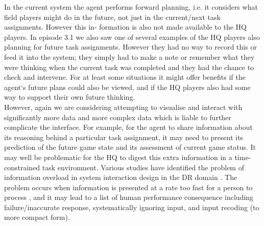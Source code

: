 In the current system the agent performs forward planning, i.e. it considers what field players might do in the future, not just in the current/next task assignments. However this in- formation is also not made available to the HQ players. In episode 3.1 we also saw one of several examples of the HQ players also planning for future task assignments. However they had no way to record this or feed it into the system; they simply had to make a note or remember what they were thinking when the current task was completed and they had the chance to check and intervene. For at least some situations it might offer benefits if the agent`s future plans could also be viewed, and if the HQ players also had some way to support their own future thinking.\\

However, again we are considering attempting to visualise and interact with significantly more data and more complex data which is liable to further complicate the interface. For example, for the agent to share information about its reasoning behind a particular task assignment, it may need to present its prediction of the future game state and its assessment of current game status. It may well be problematic for the HQ to digest this extra information in a time-constrained task environment. Various studies have identified the problem of information overload in system interaction design in the \ac{DR} domain \citep{Carver2007,Turoff2004a}. The problem occurs when information is presented at a rate too fast for a person to process \citep{Hiltz1985}, and it may lead to a list of human performance consequence \citep{Hiltz1985} including failure/inaccurate response,  systematically ignoring input, and input recoding (to more compact form). \\


